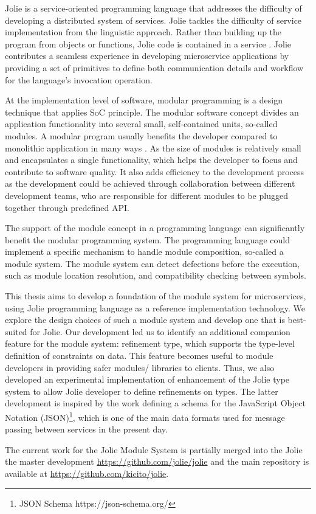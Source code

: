 Jolie\cite{JOLIE} is a service-oriented programming language that addresses the difficulty of developing a distributed system of services. Jolie tackles the difficulty of service implementation from the linguistic approach. Rather than building up the program from objects or functions, Jolie code is contained in a service \cite{jolie-website}. Jolie contributes a seamless experience in developing microservice applications by providing a set of primitives to define both communication details and workflow for the language's invocation operation.

At the implementation level of software, modular programming is a design technique that applies SoC principle. The modular software concept divides an application functionality into several small, self-contained units, so-called modules. A modular program usually benefits the developer compared to monolithic application in many ways \cite{mall-2018}. As the size of modules is relatively small and encapsulates a single functionality, which helps the developer to focus and contribute to software quality. It also adds efficiency to the development process as the development could be achieved through collaboration between different development teams, who are responsible for different modules to be plugged together through predefined API.

The support of the module concept in a programming language can significantly benefit the modular programming system. The programming language could implement a specific mechanism to handle module composition, so-called a module system. The module system can detect defections before the execution, such as module location resolution, and compatibility checking between symbols.

This thesis aims to develop a foundation of the module system for microservices, using Jolie programming language as a reference implementation technology. We explore the design choices of such a module system and develop one that is best-suited for Jolie. Our development led us to identify an additional companion feature for the module system: refinement type, which supports the type-level definition of constraints on data. This feature becomes useful to module developers in providing safer modules/ libraries to clients. Thus, we also developed an experimental implementation of enhancement of the Jolie type system to allow Jolie developer to define refinements on types. The latter development is inspired by the work defining a schema for the JavaScript Object Notation (JSON)\footnote{JSON Schema https://json-schema.org/}, which is one of the main data formats used for message passing between services in the present day.

The current work for the Jolie Module System is partially merged into the Jolie the master development \url{https://github.com/jolie/jolie} and the main repository is available at \url{https://github.com/kicito/jolie}.
